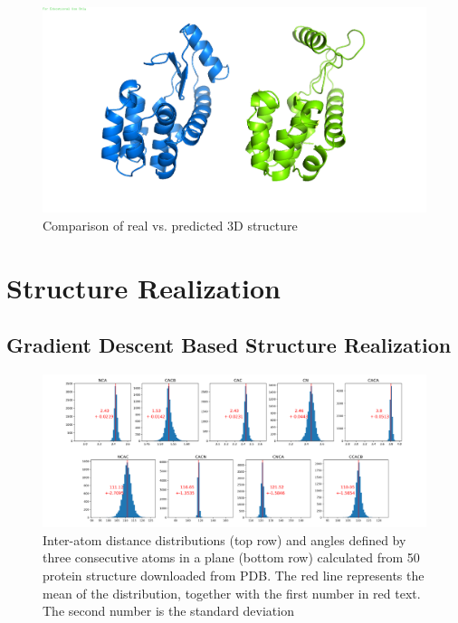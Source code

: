 \begin{figure}
    \centering
    \includegraphics[width=\linewidth]{imgs_andy/139lA00_real_pred_3D_v2.png}
    \caption{Comparison of real vs. predicted 3D structure}
    \label{fig:real_pred}
\end{figure}

\section{Structure Realization}

\subsection{Gradient Descent Based Structure Realization}

\begin{figure}
    \centering
    \includegraphics[width=\linewidth]{imgs_tomas/inter_data.png}
    \caption{Inter-atom distance distributions (top row) and angles defined by three consecutive atoms in a plane (bottom row) calculated from 50 protein structure downloaded from PDB. The red line represents the mean of the distribution, together with the first number in red text. The second number is the standard deviation}
    \label{fig:interresidue}
\end{figure}


